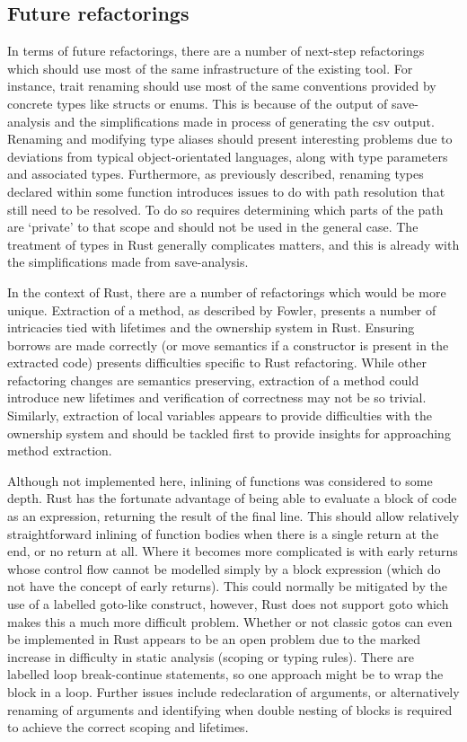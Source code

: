 \subsection{Future refactorings}
In terms of future refactorings, there are a number of next-step refactorings which should use most of the same infrastructure of the existing tool. For instance, trait renaming should use most of the same conventions provided by concrete types like structs or enums. This is because of the output of save-analysis and the simplifications made in process of generating the csv output. Renaming and modifying type aliases should present interesting problems due to deviations from typical object-orientated languages, along with type parameters and associated types. Furthermore, as previously described, renaming types declared within some function introduces issues to do with path resolution that still need to be resolved. To do so requires determining which parts of the path are `private' to that scope and should not be used in the general case. The treatment of types in Rust generally complicates matters, and this is already with the simplifications made from save-analysis.

In the context of Rust, there are a number of refactorings which would be more unique. Extraction of a method, as described by Fowler, presents a number of intricacies tied with lifetimes and the ownership system in Rust. Ensuring borrows are made correctly (or move semantics if a constructor is present in the extracted code) presents difficulties specific to Rust refactoring. While other refactoring changes are semantics preserving, extraction of a method could introduce new lifetimes and verification of correctness may not be so trivial. Similarly, extraction of local variables appears to provide difficulties with the ownership system and should be tackled first to provide insights for approaching method extraction.

Although not implemented here, inlining of functions was considered to some depth. Rust has the fortunate advantage of being able to evaluate a block of code as an expression, returning the result of the final line. This should allow relatively straightforward inlining of function bodies when there is a single return at the end, or no return at all. Where it becomes more complicated is with early returns whose control flow cannot be modelled simply by a block expression (which do not have the concept of early returns). This could normally be mitigated by the use of a labelled goto-like construct, however, Rust does not support goto which makes this a much more difficult problem. Whether or not classic gotos can even be implemented in Rust appears to be an open problem due to the marked increase in difficulty in static analysis (scoping or typing rules). There are labelled loop break-continue statements, so one approach might be to wrap the block in a loop. Further issues include redeclaration of arguments, or alternatively renaming of arguments and identifying when double nesting of blocks is required to achieve the correct scoping and lifetimes. 

